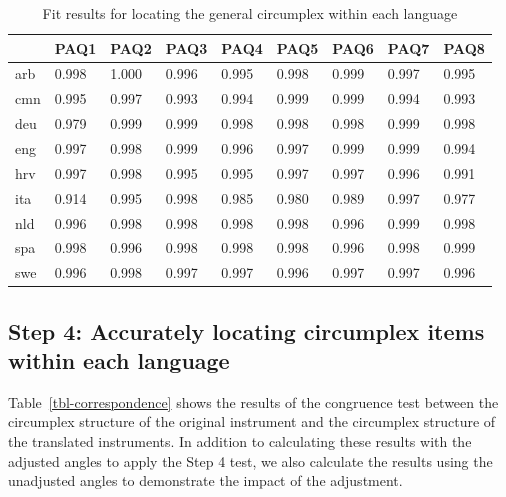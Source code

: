 \documentclass[
  authoryear,
  preprint,
  3p]{elsarticle}
\begin{document}
\begin{longtable}[]{@{}lllllllll@{}}

\caption{\label{tbl-corr-angles-fit}Fit results for locating the general
circumplex within each language}

\tabularnewline

\toprule\noalign{}
& PAQ1 & PAQ2 & PAQ3 & PAQ4 & PAQ5 & PAQ6 & PAQ7 & PAQ8 \\
\midrule\noalign{}
\endhead
\bottomrule\noalign{}
\endlastfoot
arb & 0.998 & 1.000 & 0.996 & 0.995 & 0.998 & 0.999 & 0.997 & 0.995 \\
cmn & 0.995 & 0.997 & 0.993 & 0.994 & 0.999 & 0.999 & 0.994 & 0.993 \\
deu & 0.979 & 0.999 & 0.999 & 0.998 & 0.998 & 0.998 & 0.999 & 0.998 \\
eng & 0.997 & 0.998 & 0.999 & 0.996 & 0.997 & 0.999 & 0.999 & 0.994 \\
hrv & 0.997 & 0.998 & 0.995 & 0.995 & 0.997 & 0.997 & 0.996 & 0.991 \\
ita & 0.914 & 0.995 & 0.998 & 0.985 & 0.980 & 0.989 & 0.997 & 0.977 \\
nld & 0.996 & 0.998 & 0.998 & 0.998 & 0.998 & 0.996 & 0.999 & 0.998 \\
spa & 0.998 & 0.996 & 0.998 & 0.998 & 0.998 & 0.996 & 0.998 & 0.999 \\
swe & 0.996 & 0.998 & 0.997 & 0.997 & 0.996 & 0.997 & 0.997 & 0.996 \\

\end{longtable}

\subsection{Step 4: Accurately locating circumplex items within each
language}\label{step-4-accurately-locating-circumplex-items-within-each-language-1}

Table~\ref{tbl-correspondence} shows the results of the congruence test
between the circumplex structure of the original instrument and the
circumplex structure of the translated instruments. In addition to
calculating these results with the adjusted angles to apply the Step 4
test, we also calculate the results using the unadjusted angles to
demonstrate the impact of the adjustment.
\end{document}
